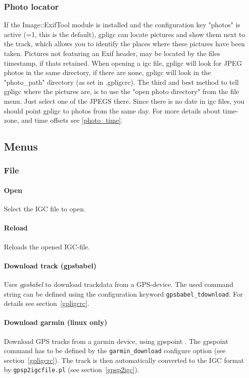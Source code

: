 \subsubsection{Photo locator}
If the Image::ExifTool module is installed and the configuration key "photos" is active (=1, this is the default),
gpligc can locate pictures and show them next to the track, which allows you to identify the places where these pictures have been taken. Pictures not featuring an Exif header, may be located by the files timestamp, if thats retained.
When opening a igc file, gpligc will look for JPEG photos in the same directory, if there are none, gpligc will look in the
"photo\_path" directory (as set in .gpligcrc). The third and best method to tell gpligc where the pictures are, is to use the
"open photo directory" from the file menu. Just select one of the JPEGS there.
Since there is no date in igc files, you should point gpligc to photos from the same day. For more details about time-zone, and time offsets see \ref{photo_time}.


\subsection{Menus}

\subsubsection{File}
\paragraph{Open}
Select the IGC file to open.

\paragraph{Reload}
Reloads the opened IGC-file.

\paragraph{Download track (gpsbabel)}
Uses \emph{gpsbabel} \cite{gpsbabel} to download trackdata from a GPS-device. 
The used command string can be defined using the configuration keyword \texttt{gpsbabel\_tdownload}.
For details see section~\ref{gpligcrc}.

\paragraph{Download garmin (linux only)}
Download GPS tracks from a garmin device, using gpspoint \cite{gpspoint}.
The gpspoint command has to be defined by the \texttt{garmin\_download} configure option (see section~\ref{gpligcrc}).
The track is then automatically converted to the IGC format by \texttt{gpsp2igcfile.pl} (see section~\ref{gpsp2igc}).

